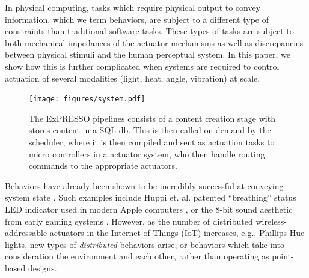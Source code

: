 \documentclass{sigchi}
\begin{document}

  In physical computing, tasks which require physical output to convey information, which we term behaviors, are subject to a different type of constraints than traditional software tasks. These types of tasks are subject to both mechanical impedances of the actuator mechanisms as well as discrepancies between physical stimuli and the human perceptual system. In this paper, we show how this is further complicated when systems are required to control actuation of several modalities (light, heat, angle, vibration) at scale. 


    \begin{figure}[t]
      \centering
      \texttt{[image: figures/system.pdf]}
      \caption{ The ExPRESSO pipelines consists of a content creation stage with stores content in a SQL db. This is then called-on-demand by the scheduler, where it is then compiled and sent as actuation tasks to micro controllers in a actuator system, who then handle routing commands to the appropriate actuators. }
        \label{fig:system} 
    \end{figure}

 Behaviors have already been shown to be incredibly successful at conveying system state \cite{harrison_unlocking_2012,kuznetsov_red_2011}. Such examples include Huppi et. al. patented ``breathing'' status LED indicator used in modern Apple computers \cite{huppi_breathing_2003}, or the 8-bit sound aesthetic from early gaming systems \cite{kaliakatsospapakostas_interactive_2012}. 
 However, as the number of distributed wireless-addressable actuators in the Internet of Things (IoT) increases, e.g., Phillips Hue lights, new types of \textit{distributed} behaviors arise, or behaviors which take into consideration the environment and each other, rather than operating as point-based designs. 
\end{document}
